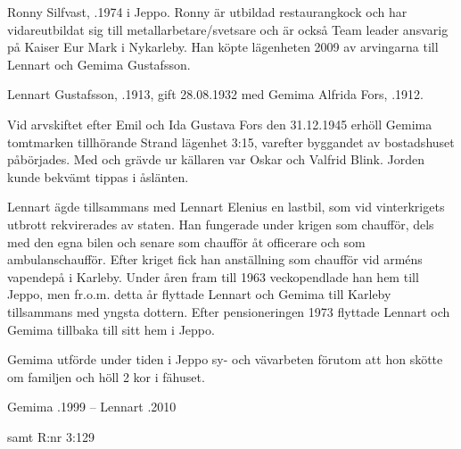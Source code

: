 

Ronny Silfvast, .1974 i Jeppo. Ronny är utbildad restaurangkock och har vidareutbildat sig till metallarbetare/svetsare och är också Team leader ansvarig på Kaiser Eur Mark i Nykarleby. Han köpte lägenheten 2009 av arvingarna till Lennart och Gemima Gustafsson.



Lennart Gustafsson, .1913, gift 28.08.1932 med Gemima Alfrida Fors, .1912.
\begin{jhchildren}
  \item {}
  \item {}
  \item {}
  \item {}
  \item {}
\end{jhchildren}

Vid arvskiftet efter Emil och Ida Gustava Fors den 31.12.1945 erhöll Gemima tomtmarken tillhörande Strand lägenhet 3:15, varefter byggandet av bostadshuset påbörjades. Med och grävde ur källaren var Oskar och Valfrid Blink. Jorden kunde bekvämt tippas i åslänten.

Lennart ägde tillsammans med Lennart Elenius en lastbil, som vid vinterkrigets utbrott rekvirerades av staten. Han fungerade under krigen som chaufför, dels med den egna bilen och senare som chaufför åt officerare och som ambulanschaufför. Efter kriget fick han anställning som chaufför vid arméns vapendepå i Karleby. Under åren fram till 1963 veckopendlade han hem till Jeppo, men fr.o.m. detta år flyttade Lennart och Gemima till Karleby tillsammans med yngsta dottern. Efter pensioneringen 1973 flyttade Lennart och Gemima tillbaka till sitt hem i Jeppo.

Gemima utförde under tiden i Jeppo sy- och vävarbeten förutom att hon skötte om familjen och höll 2 kor i fähuset.

Gemima .1999  --  Lennart .2010



 samt  R:nr 3:129



